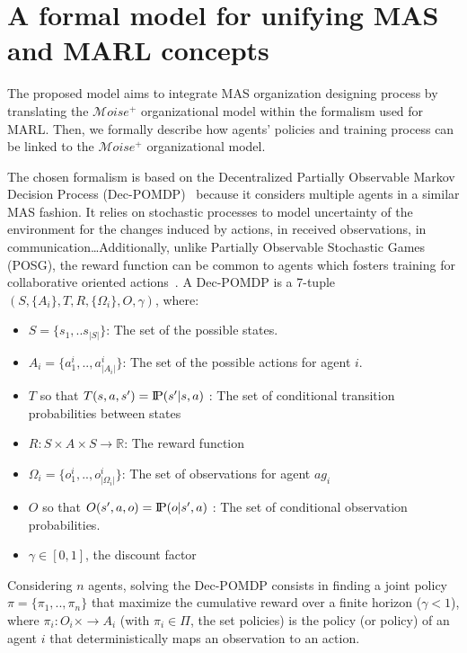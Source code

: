 \documentclass[runningheads]{llncs}
\newcommand{\probP}{\text{I\kern-0.15em P}}
\begin{document}
\section{A formal model for unifying MAS and MARL concepts}

The proposed model aims to integrate MAS organization designing process by translating the $\mathcal{M}oise^{+}$ organizational model within the formalism used for MARL. Then, we formally describe how agents' policies and training process can be linked to the $\mathcal{M}oise^{+}$ organizational model.

The chosen formalism is based on the Decentralized Partially Observable Markov Decision Process (Dec-POMDP)~\cite{Oliehoek2016} because it considers multiple agents in a similar MAS fashion. It relies on stochastic processes to model uncertainty of the environment for the changes induced by actions, in received observations, in communication\dots Additionally, unlike Partially Observable Stochastic Games (POSG), the reward function can be common to agents which fosters training for collaborative oriented actions~\cite{Beynier2013}.
A Dec-POMDP is a 7-tuple $(S,\{A_i\},T,R,\{\Omega_i\},O,\gamma)$, where:
\begin{itemize}
    \item $S = \{s_1, ..s_{|S|}\}$: The set of the possible states.
    \item $A_{i} = \{a_{1}^{i},..,a_{|A_{i}|}^{i}\}$: The set of the possible actions for agent $i$.
    \item $T$ so that $T(s,a,s') = \probP{(s'|s,a)}$ : The set of conditional transition probabilities between states
    \item $R: S \times A \times S \rightarrow \mathbb{R}$: The reward function
    \item $\Omega_{i} = \{o_{1}^{i},..,o_{|\Omega_{i}|}^{i}\}$: The set of observations for agent $ag_i$
    \item $O$ so that $O(s',a,o) = \probP{(o|s',a)}$ : The set of conditional observation probabilities.
    \item $\gamma \in [0,1]$, the discount factor
\end{itemize}
Considering $n$ agents, solving the Dec-POMDP consists in finding a joint policy $\pi = \{\pi_1,..,\pi_n\}$ that maximize the cumulative reward over a finite horizon ($\gamma < 1$), where $\pi_i: O_i \times \rightarrow A_i$ (with $\pi_i \in \Pi$, the set policies) is the policy (or policy) of an agent $i$ that deterministically maps an observation to an action\cite{Beynier2013}.
\end{document}
